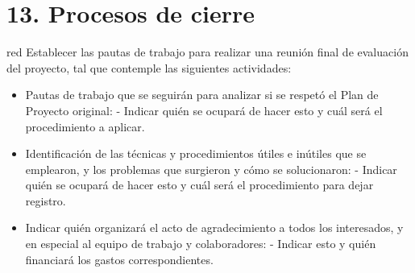 \documentclass[
11pt, %
]{charter}
\begin{document}
\section{13. Procesos de cierre}    
\label{sec:cierre}

\begin{consigna}{red}
Establecer las pautas de trabajo para realizar una reunión final de evaluación del proyecto, tal que contemple las siguientes actividades:

\begin{itemize}
	\item Pautas de trabajo que se seguirán para analizar si se respetó el Plan de Proyecto original:
	 - Indicar quién se ocupará de hacer esto y cuál será el procedimiento a aplicar. 
	\item Identificación de las técnicas y procedimientos útiles e inútiles que se emplearon, y los problemas que surgieron y cómo se solucionaron:
	 - Indicar quién se ocupará de hacer esto y cuál será el procedimiento para dejar registro.
	\item Indicar quién organizará el acto de agradecimiento a todos los interesados, y en especial al equipo de trabajo y colaboradores:
	  - Indicar esto y quién financiará los gastos correspondientes.
\end{itemize}

\end{consigna}
\end{document}
